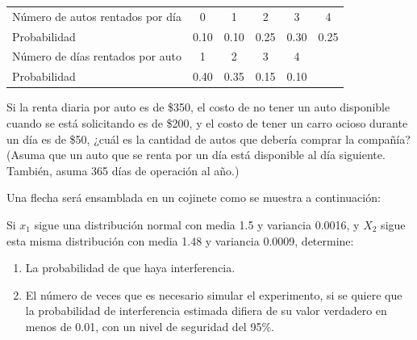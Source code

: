 \documentclass[11pt,letterpaper]{report}
\begin{document}
\begin{description}[leftmargin=1.2cm,style=nextline]
\begin{center}
\begin{tabular}{lccccc}
Número de autos rentados por día & 0 & 1 & 2 & 3 & 4 \\
Probabilidad & 0.10 & 0.10 & 0.25 & 0.30 & 0.25 \\[6pt]
Número de días rentados por auto & 1 & 2 & 3 & 4 & \\
Probabilidad & 0.40 & 0.35 & 0.15 & 0.10 & \\
\end{tabular}
\end{center}

Si la renta diaria por auto es de \$350, el costo de no tener un auto
disponible cuando se está solicitando es de \$200, y el costo de tener un
carro ocioso durante un día es de \$50, ¿cuál es la cantidad de autos que
debería comprar la compañía? (Asuma que un auto que se renta por un día está
disponible al día siguiente. También, asuma 365 días de operación al año.)

\item[5.4.] Una flecha será ensamblada en un cojinete como se muestra a
continuación:

\begin{center}
\end{center}

Si $x_1$ sigue una distribución normal con media 1.5 y variancia 0.0016, y
$X_2$ sigue esta misma distribución con media 1.48 y variancia 0.0009,
determine:
\begin{enumerate}[label=\alph*)]
\item La probabilidad de que haya interferencia.
\item El número de veces que es necesario simular el experimento, si se
quiere que la probabilidad de interferencia estimada difiera de su valor
verdadero en menos de 0.01, con un nivel de seguridad del 95\%.
\end{enumerate}


\end{description}
\end{document}
